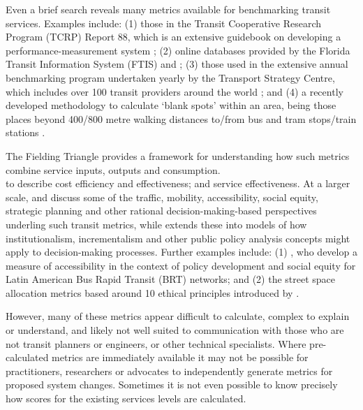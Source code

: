 \documentclass[preprint, 3p,
authoryear]{elsarticle} %
\begin{document}
Even a brief search reveals many metrics available for benchmarking
transit services. Examples include: (1) those in the Transit Cooperative
Research Program (TCRP) Report 88, which is an extensive guidebook on
developing a performance-measurement system \citep{Ryus:2003aa}; (2)
online databases provided by the Florida Transit Information System
(FTIS) \citep{Florida-Transit-Information-System:2018aa} and
\citet{UITP:2015aa}; (3) those used in the extensive annual benchmarking
program undertaken yearly by the Transport Strategy Centre, which
includes over 100 transit providers around the world
\citep{Imperial-College-London:2023aa}; and (4) a recently developed
methodology to calculate `blank spots' within an area, being those
places beyond 400/800 metre walking distances to/from bus and tram
stops/train stations \citep{AlamriSultan2023GAoA}.

The Fielding Triangle \citep{FieldingGordonJ1987Mpts} provides a
framework for understanding how such metrics combine service inputs,
outputs and consumption.\\
to describe cost efficiency and effectiveness; and service
effectiveness. At a larger scale, \citet{Litman:2003ab} and
\citet{Litman:2016aa} discuss some of the traffic, mobility,
accessibility, social equity, strategic planning and other rational
decision-making-based perspectives underling such transit metrics, while
\citet{Reynolds:2017ah} extends these into models of how
institutionalism, incrementalism and other public policy analysis
concepts might apply to decision-making processes. Further examples
include: (1) \citet{GuzmanLuisA.2017Aeit}, who develop a measure of
accessibility in the context of policy development and social equity for
Latin American Bus Rapid Transit (BRT) networks; and (2) the street
space allocation metrics based around 10 ethical principles introduced
by \citet{Creutzig2020streetspaceallocation}.

However, many of these metrics appear difficult to calculate, complex to
explain or understand, and likely not well suited to communication with
those who are not transit planners or engineers, or other technical
specialists. Where pre-calculated metrics are immediately available it
may not be possible for practitioners, researchers or advocates to
independently generate metrics for proposed system changes. Sometimes it
is not even possible to know precisely how scores for the existing
services levels are calculated.
\end{document}
